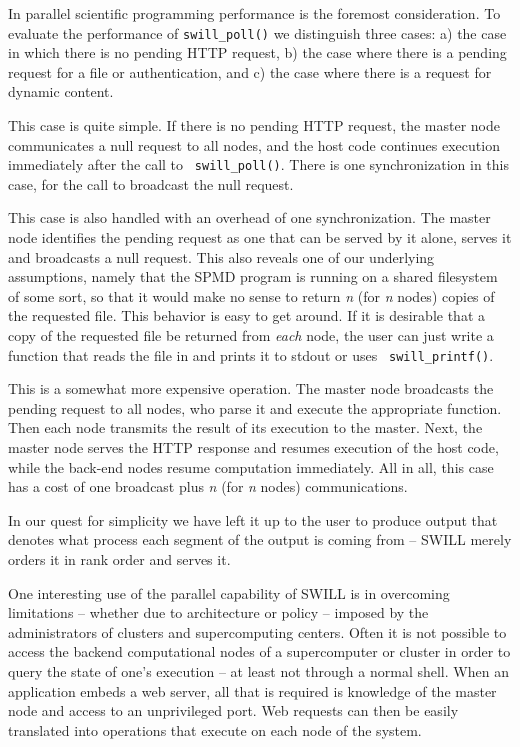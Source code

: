 In parallel scientific programming performance is the foremost consideration.
To evaluate the performance of {\tt swill\_poll()} we distinguish three cases: a) the case in
which there is no pending HTTP request, b) the case where there is a
pending request for a file or authentication, and c) the case where
there is a request for dynamic content.
\begin{itemize}
{\item[a)]
This case is quite simple. If there is no pending HTTP request, the
master node communicates a null request to all nodes, and the host
code continues execution immediately after the call to {\tt
swill\_poll()}. There is one synchronization in this case, for the call
to broadcast the null request.
}
{\item[b)]
This case is also handled with an overhead of one
synchronization. The master node identifies the pending request as one
that can be served by it alone, serves it and broadcasts a null
request. 
This also reveals one of our underlying assumptions, namely that the SPMD 
program is running on a shared
filesystem of some sort, so that it would make no sense to return {\em
n} (for {\em n} nodes) copies of the requested file. This behavior is
easy to get around. If it is desirable that a copy of the requested
file be returned from {\em each} node, the user can just write a
function that reads the file in and prints it to stdout or uses {\tt
swill\_printf()}.
}
{\item[c)]
This is a somewhat more expensive operation. 
The master node broadcasts the pending request to all
nodes, who parse it and execute the appropriate function. Then each
node transmits the result of its execution to the master. Next, the
master node serves the HTTP response and resumes execution of the host
code, while the back-end nodes resume computation immediately.
All in all, this case has a cost of one broadcast plus {\em
n} (for {\em n} nodes) communications.
}
\end{itemize}

In our quest for simplicity we have left it up to the
user to produce output that denotes what process each segment of the
output is coming from -- SWILL merely orders it in rank order and
serves it.

One interesting use of the parallel capability of SWILL is in overcoming
limitations -- whether due to architecture or policy -- imposed by the
administrators of clusters and supercomputing centers.  Often it is
not possible to access the backend computational nodes of a
supercomputer or cluster in order to query the state of one's
execution -- at least not through a normal shell.  When an application
embeds a web server, all that is required is knowledge of the master
node and access to an unprivileged port.  Web requests can then be
easily translated into operations that execute on each node of the system.

